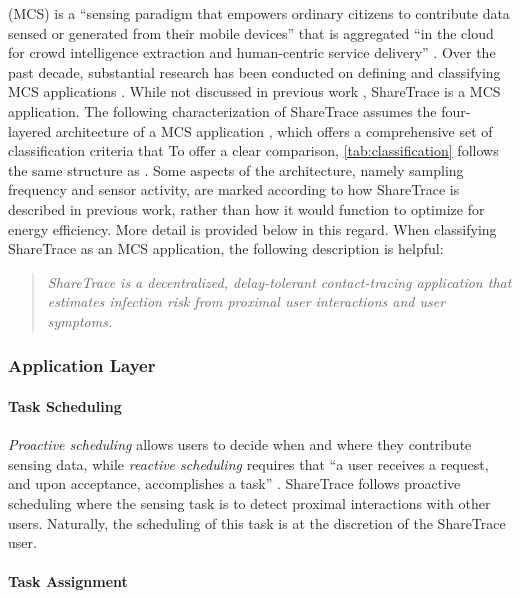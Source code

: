  (MCS) is a ``sensing paradigm that empowers ordinary citizens to contribute data sensed or generated from their mobile devices'' that is aggregated ``in the cloud for crowd intelligence extraction and human-centric service delivery'' \citep{Guo2015}. Over the past decade, substantial research has been conducted on defining and classifying MCS applications \citep[and references therein]{Capponi2019, Guo2015}. While not discussed in previous work \citep{Ayday2020, Ayday2021}, ShareTrace is a MCS application. The following characterization of ShareTrace assumes the four-layered architecture of a MCS application \citep{Capponi2019}, which offers a comprehensive set of classification criteria that To offer a clear comparison, \cref{tab:classification} follows the same structure as \citet{Capponi2019}. Some aspects of the architecture, namely sampling frequency and sensor activity, are marked according to how ShareTrace is described in previous work, rather than how it would function to optimize for energy efficiency. More detail is provided below in this regard. When classifying ShareTrace as an MCS application, the following description is helpful:
\begin{quote}
  \emph{ShareTrace is a decentralized, delay-tolerant contact-tracing application that estimates infection risk from proximal user interactions and user symptoms.}
\end{quote}

\subsubsection{Application Layer}

\paragraph{Task Scheduling}

\emph{Proactive scheduling} allows users to decide when and where they contribute sensing data, while \emph{reactive scheduling} requires that ``a user receives a request, and upon acceptance, accomplishes a task'' \citep{Capponi2019}. ShareTrace follows proactive scheduling where the sensing task is to detect proximal interactions with other users. Naturally, the scheduling of this task is at the discretion of the ShareTrace user.

\paragraph{Task Assignment}

